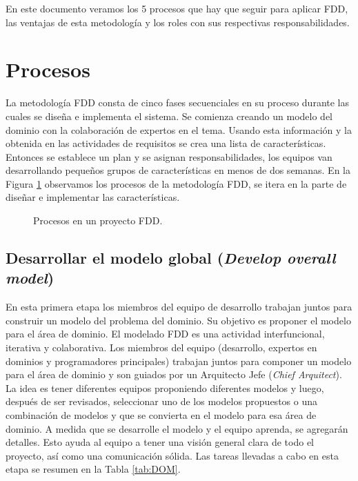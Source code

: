 \documentclass[11pt]{article}
\begin{document}
En este documento veramos los 5 procesos que hay que seguir para aplicar FDD, las ventajas de esta metodología y los roles con sus respectivas responsabilidades.

\section{Procesos}

La metodología FDD consta de cinco fases secuenciales en su proceso durante las cuales se diseña e implementa el sistema. Se comienza creando un modelo del dominio con la colaboración de expertos en el tema. Usando esta información y la obtenida en las actividades de requisitos se crea una lista de características. Entonces se establece un plan y se asignan responsabilidades, los equipos van desarrollando pequeños grupos de características en menos de dos semanas. En la Figura \ref{fig:proc} observamos los procesos de la metodología FDD, se itera en la parte de diseñar e implementar las características.

\begin{figure}[H]
    \centering
    \caption{Procesos en un proyecto FDD.}
    \label{fig:proc}
\end{figure}

\subsection{Desarrollar el modelo global (\textit{Develop overall model})}
En esta primera etapa los miembros del equipo de desarrollo trabajan juntos para construir un modelo del problema del dominio. Su objetivo es proponer el modelo para el área de dominio. El modelado FDD es una actividad interfuncional, iterativa y colaborativa. Los miembros del equipo (desarrollo, expertos en dominios y programadores principales) trabajan juntos para componer un modelo para el área de dominio y son guiados por un Arquitecto Jefe (\textit{Chief Arquitect}). La idea es tener diferentes equipos proponiendo diferentes modelos y luego, después de ser revisados, seleccionar uno de los modelos propuestos o una combinación de modelos y que se convierta en el modelo para esa área de dominio. A medida que se desarrolle el modelo y el equipo aprenda, se agregarán detalles. Esto ayuda al equipo a tener una visión general clara de todo el proyecto, así como una comunicación sólida. Las tareas llevadas a cabo en esta etapa se resumen en la Tabla \ref{tab:DOM}. 
\end{document}
